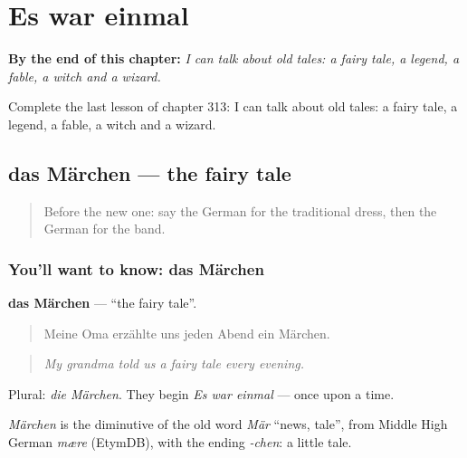 
\chapter{Es war einmal}
\label{ch:ge-es-war-einmal}

\begin{chapteropening}
\textbf{By the end of this chapter:} \emph{I can talk about old tales: a fairy tale, a legend, a fable, a witch and a wizard.}

Complete the last lesson of chapter 313: I can talk about old tales: a fairy tale, a legend, a fable, a witch and a wizard.
\end{chapteropening}

\section[das Märchen]{das Märchen — the fairy tale}

\label{lesson:GE-C313-maerchen}



\begin{quote}
Before the new one: say the German for the traditional dress, then the German for the band.
\end{quote}

\subsection*{You'll want to know: das Märchen}
\textbf{das Märchen} — \textquotedblleft{}the fairy tale\textquotedblright{}.

\begin{quote}
Meine Oma erzählte uns jeden Abend ein Märchen.
\end{quote}

\begin{quote}
\emph{My grandma told us a fairy tale every evening.}
\end{quote}

Plural: \emph{die Märchen}. They begin \emph{Es war einmal} — once upon a time.

\begin{cousinweb}
\emph{Märchen} is the diminutive of the old word \emph{Mär} \textquotedblleft{}news, tale\textquotedblright{}, from Middle High German \emph{mære} (EtymDB), with the ending \emph{-chen}: a little tale.
\end{cousinweb}

